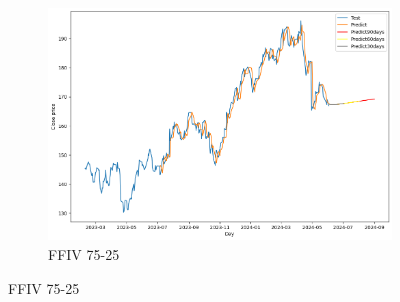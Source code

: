 \documentclass{ieeeojies}
\begin{document}
\begin{figure}[H]
    \hfill
    \begin{subfigure}[b]{0.33\linewidth}
        \centering
        \includegraphics[width=\linewidth]{GRU Plot/GRU_FFIV_75_25.png}
        \caption{FFIV 75-25}
        \label{fig:ffiv-75-25}
    \end{subfigure}
\end{figure}
\end{document}
